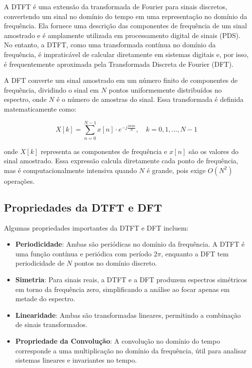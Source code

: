 
A DTFT é uma extensão da transformada de Fourier para sinais discretos, convertendo um sinal no domínio do tempo em uma representação no domínio da frequência. Ela fornece uma descrição das componentes de frequência de um sinal amostrado e é amplamente utilizada em processamento digital de sinais (PDS). No entanto, a DTFT, como uma transformada contínua no domínio da frequência, é impraticável de calcular diretamente em sistemas digitais e, por isso, é frequentemente aproximada pela Transformada Discreta de Fourier (DFT).

A DFT converte um sinal amostrado em um número finito de componentes de frequência, dividindo o sinal em $N$ pontos uniformemente distribuídos no espectro, onde $N$ é o número de amostras do sinal. Essa transformada é definida matematicamente como:

$$
X[k] = \sum_{n=0}^{N-1} x[n] \cdot e^{-j \frac{2 \pi k n}{N}}, \quad k = 0, 1, \dots, N-1
$$

onde $X[k]$ representa as componentes de frequência e $x[n]$ são os valores do sinal amostrado. Essa expressão calcula diretamente cada ponto de frequência, mas é computacionalmente intensiva quando $N$ é grande, pois exige $O(N^2)$ operações.

\subsection{Propriedades da DTFT e DFT}

Algumas propriedades importantes da DTFT e DFT incluem:

\begin{itemize}
    \item \textbf{Periodicidade}: Ambas são periódicas no domínio da frequência. A DTFT é uma função contínua e periódica com período $2\pi$, enquanto a DFT tem periodicidade de $N$ pontos no domínio discreto.
    \item \textbf{Simetria}: Para sinais reais, a DTFT e a DFT produzem espectros simétricos em torno da frequência zero, simplificando a análise ao focar apenas em metade do espectro.
    \item \textbf{Linearidade}: Ambas são transformadas lineares, permitindo a combinação de sinais transformados.
    \item \textbf{Propriedade da Convolução}: A convolução no domínio do tempo corresponde a uma multiplicação no domínio da frequência, útil para analisar sistemas lineares e invariantes no tempo.
\end{itemize}

